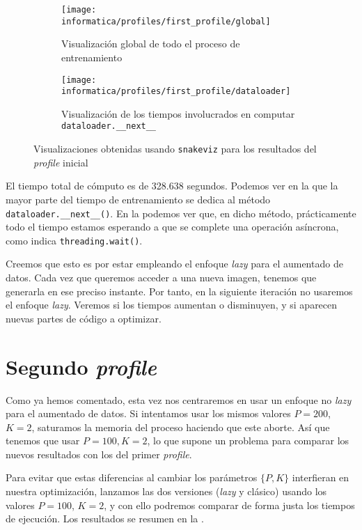 \begin{figure}[!hbtp]
	\centering
	\ajustarsubcaptions

	\begin{subfigure}{.5\textwidth}
		\centering
		\texttt{[image: informatica/profiles/first\_profile/global]}
		\caption{Visualización global de todo el proceso de entrenamiento}
		\label{img:first_profile_global}
	\end{subfigure}%
	\begin{subfigure}{.5\textwidth}
		\centering
		\texttt{[image: informatica/profiles/first\_profile/dataloader]}
		\caption{Visualización de los tiempos involucrados en computar \lstinline{dataloader.__next__}}
		\label{img:first_profile_dataloader_next}
	\end{subfigure}
	\caption{Visualizaciones obtenidas usando \lstinline{snakeviz} para los resultados del \textit{profile} inicial}
	\label{img:optimizacion_01}
\end{figure}

El tiempo total de cómputo es de 328.638 segundos. Podemos ver en la  que la mayor parte del tiempo de entrenamiento se dedica al método \lstinline{dataloader.__next__()}. En la  podemos ver que, en dicho método, prácticamente todo el tiempo estamos esperando a que se complete una operación asíncrona, como indica \lstinline{threading.wait()}.

Creemos que esto es por estar empleando el enfoque \textit{lazy} para el aumentado de datos. Cada vez que queremos acceder a una nueva imagen, tenemos que generarla en ese preciso instante. Por tanto, en la siguiente iteración no usaremos el enfoque \textit{lazy}. Veremos si los tiempos aumentan o disminuyen, y si aparecen nuevas partes de código a optimizar.

\section{Segundo \textit{profile}}

Como ya hemos comentado, esta vez nos centraremos en usar un enfoque no \textit{lazy} para el aumentado de datos. Si intentamos usar los mismos valores $P = 200$, $K = 2$, saturamos la memoria del proceso haciendo que este aborte. Así que tenemos que usar $P = 100, K = 2$, lo que supone un problema para comparar los nuevos resultados con los del primer \textit{profile}.

Para evitar que estas diferencias al cambiar los parámetros $\{P, K\}$ interfieran en nuestra optimización, lanzamos las dos versiones (\textit{lazy} y clásico) usando los valores $P = 100$, $K = 2$, y con ello podremos comparar de forma justa los tiempos de ejecución. Los resultados se resumen en la .

